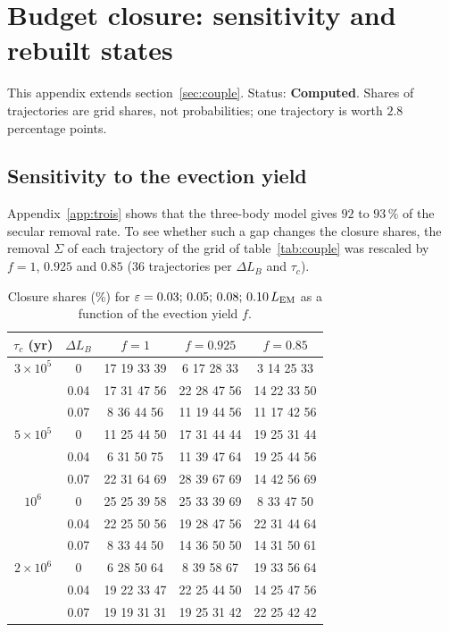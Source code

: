 \documentclass[11pt,a4paper]{article}
\newcommand{\LEM}{\ensuremath{L_{\rm EM}}}
\newcommand{\stCalc}{\textcolor{vert}{\textbf{Computed}}}
\begin{document}
\section{Budget closure: sensitivity and rebuilt states}
\label{app:ferm}

This appendix extends section~\ref{sec:couple}. Status: \stCalc. Shares of trajectories are grid shares, not probabilities; one trajectory is worth $2.8$ percentage points.

\subsection{Sensitivity to the evection yield}

Appendix~\ref{app:trois} shows that the three-body model gives $92$ to $93\,\%$ of the secular removal rate. To see whether such a gap changes the closure shares, the removal $\Sigma$ of each trajectory of the grid of table~\ref{tab:couple} was rescaled by $f=1$, $0.925$ and $0.85$ (36 trajectories per $\Delta L_B$ and $\tau_c$).

\begin{table}[htbp]
\centering\footnotesize\setlength{\tabcolsep}{4pt}
\caption{Closure shares (\%) for $\varepsilon=0.03;\,0.05;\,0.08;\,0.10\,\LEM$ as a function of the evection yield $f$.\label{tab:sensib}}
\begin{tabular}{ccccc}\toprule
$\tau_c$ (yr) & $\Delta L_B$ & $f=1$ & $f=0.925$ & $f=0.85$ \\\midrule
$3\times10^5$ & 0 & 17 19 33 39 & 6 17 28 33 & 3 14 25 33\\
 & 0.04 & 17 31 47 56 & 22 28 47 56 & 14 22 33 50\\
 & 0.07 & 8 36 44 56 & 11 19 44 56 & 11 17 42 56\\\midrule
$5\times10^5$ & 0 & 11 25 44 50 & 17 31 44 44 & 19 25 31 44\\
 & 0.04 & 6 31 50 75 & 11 39 47 64 & 19 25 44 56\\
 & 0.07 & 22 31 64 69 & 28 39 67 69 & 14 42 56 69\\\midrule
$10^6$ & 0 & 25 25 39 58 & 25 33 39 69 & 8 33 47 50\\
 & 0.04 & 22 25 50 56 & 19 28 47 56 & 22 31 44 64\\
 & 0.07 & 8 33 44 50 & 14 36 50 50 & 14 31 50 61\\\midrule
$2\times10^6$ & 0 & 6 28 50 64 & 8 39 58 67 & 19 33 56 64\\
 & 0.04 & 19 22 33 47 & 22 25 44 50 & 14 25 47 56\\
 & 0.07 & 19 19 31 31 & 19 25 31 42 & 22 25 42 42\\\bottomrule
\end{tabular}
\end{table}
\end{document}
